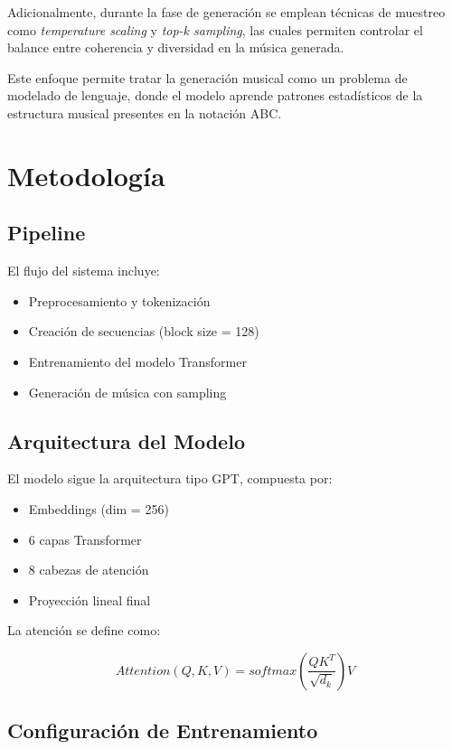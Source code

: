 \documentclass[conference]{IEEEtran}
\begin{document}
Adicionalmente, durante la fase de generación se emplean técnicas de muestreo como \textit{temperature scaling} y \textit{top-k sampling}, las cuales permiten controlar el balance entre coherencia y diversidad en la música generada.

Este enfoque permite tratar la generación musical como un problema de modelado de lenguaje, donde el modelo aprende patrones estadísticos de la estructura musical presentes en la notación ABC.

\section{Metodología}

\subsection{Pipeline}

El flujo del sistema incluye:

\begin{itemize}
\item Preprocesamiento y tokenización
\item Creación de secuencias (block size = 128)
\item Entrenamiento del modelo Transformer
\item Generación de música con sampling
\end{itemize}

\subsection{Arquitectura del Modelo}

El modelo sigue la arquitectura tipo GPT, compuesta por:

\begin{itemize}
\item Embeddings (dim = 256)
\item 6 capas Transformer
\item 8 cabezas de atención
\item Proyección lineal final
\end{itemize}

La atención se define como:

\begin{equation}
Attention(Q,K,V) =
softmax\left(\frac{QK^T}{\sqrt{d_k}}\right)V
\end{equation}

\subsection{Configuración de Entrenamiento}
\end{document}
